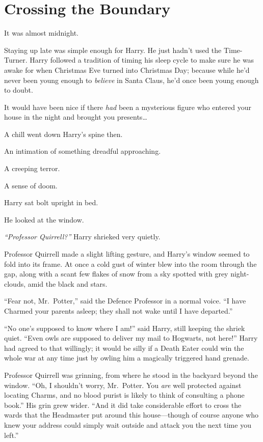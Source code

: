 \chapter{Crossing the Boundary}

It was almost midnight.

Staying up late was simple enough for Harry. He just hadn't used the
Time-Turner. Harry followed a tradition of timing his sleep cycle to
make sure he was awake for when Christmas Eve turned into Christmas Day;
because while he'd never been young enough to \emph{believe} in Santa
Claus, he'd once been young enough to doubt.

It would have been nice if there \emph{had} been a mysterious figure who
entered your house in the night and brought you presents\ldots{}

A chill went down Harry's spine then.

An intimation of something dreadful approaching.

A creeping terror.

A sense of doom.

Harry sat bolt upright in bed.

He looked at the window.

\emph{``Professor Quirrell?''} Harry shrieked very quietly.

Professor Quirrell made a slight lifting gesture, and Harry's window
seemed to fold into its frame. At once a cold gust of winter blew into
the room through the gap, along with a scant few flakes of snow from a
sky spotted with grey night-clouds, amid the black and stars.

``Fear not, Mr.~Potter,'' said the Defence Professor in a normal voice.
``I have Charmed your parents asleep; they shall not wake until I have
departed.''

``No one's supposed to know where I am!'' said Harry, still keeping the
shriek quiet. ``Even owls are supposed to deliver my mail to Hogwarts,
not here!'' Harry had agreed to that willingly; it would be silly if a
Death Eater could win the whole war at any time just by owling him a
magically triggered hand grenade.

Professor Quirrell was grinning, from where he stood in the backyard
beyond the window. ``Oh, I shouldn't worry, Mr.~Potter. You \emph{are}
well protected against locating Charms, and no blood purist is likely to
think of consulting a phone book.'' His grin grew wider. ``And it did
take considerable effort to cross the wards that the Headmaster put
around this house---though of course anyone who knew your address could
simply wait outside and attack you the next time you left.''

